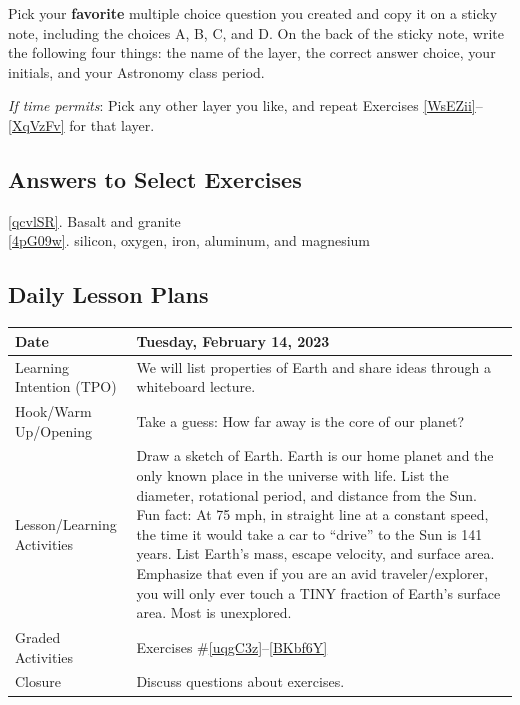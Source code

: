 \documentclass{article}
\numberwithin{equation}{section}
\numberwithin{figure}{section}
\begin{document}
\begin{exercise}
    Pick your \textbf{favorite} multiple choice question you created and copy it on a sticky note, including the choices A, B, C, and D. On the back of the sticky note, write the following four things: the name of the layer, the correct answer choice, your initials, and your Astronomy class period. 
\end{exercise}

\begin{exercise}
    \textit{If time permits}: Pick any other layer you like, and repeat Exercises \ref{WsEZii}--\ref{XqVzFv} for that layer.
\end{exercise}



\clearpage
\subsection*{Answers to Select Exercises}

\ref{qcvlSR}. Basalt and granite\\
\ref{4pG09w}. silicon, oxygen, iron, aluminum, and magnesium\\


\clearpage
\subsection*{Daily Lesson Plans}

\begin{tabular}{|m{}|m{}|}
    \hline  
    \cellcolor{black!20}\textbf{Date} &
    \cellcolor{black!20}\textbf{Tuesday, February 14, 2023} \\
    \hline
    Learning Intention (TPO) & We will list properties of Earth and share ideas through a whiteboard lecture.\\
    \hline
    Hook/Warm Up/Opening & Take a guess: How far away is the core of our planet?\\
    \hline
    Lesson/Learning Activities & Draw a sketch of Earth. Earth is our home planet and the only known place in the universe with life. List the diameter, rotational period, and distance from the Sun. Fun fact: At 75 mph, in straight line at a constant speed, the time it would take a car to ``drive'' to the Sun is 141 years. List Earth's mass, escape velocity, and surface area. Emphasize that even if you are an avid traveler/explorer, you will only ever touch a TINY fraction of Earth's surface area. Most is unexplored.\\
    \hline
    Graded Activities & Exercises \#\ref{uqgC3z}--\ref{BKbf6Y}\\
    \hline
    Closure & Discuss questions about exercises.\\  
    \hline
\end{tabular}
\end{document}
